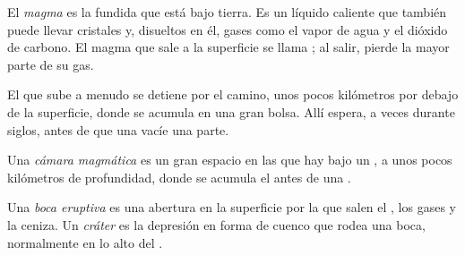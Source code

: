\begin{definition}[Magma]\label{def:g7:volcanoes:magma}
El \emph{magma} es la  fundida que está bajo tierra. Es un
líquido caliente que también puede llevar cristales y, disueltos en él,
gases como el vapor de agua y el dióxido de carbono. El magma que sale a la
superficie se llama ; al salir, pierde la mayor parte de su gas.
\end{definition}

El  que sube a menudo se detiene por el camino, unos pocos kilómetros
por debajo de la superficie, donde se acumula en una gran bolsa. Allí
espera, a veces durante siglos, antes de que una  vacíe una parte.

\begin{definition}\label{def:g7:volcanoes:magma-chamber}
Una \emph{cámara magmática} es un
gran espacio en las  que hay bajo un , a unos pocos kilómetros
de profundidad, donde se acumula el  antes de una .
\end{definition}

\begin{definition}\label{def:g7:volcanoes:vent}
Una \emph{boca eruptiva} es una abertura en la
superficie por la que salen el , los gases y la ceniza. Un
\emph{cráter} es la depresión en forma de cuenco que
rodea una boca, normalmente en lo alto del .
\end{definition}

